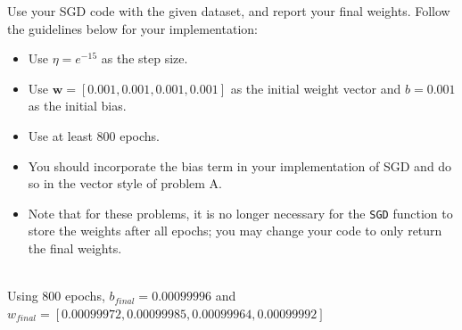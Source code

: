 \begin{problem}[6]
  Use your SGD code with the given dataset, and report your final weights. Follow the guidelines below for your implementation:

  \begin{itemize}
    \item Use $\eta = e^{-15}$ as the step size.  
    \item Use $\mathbf{w} = [0.001, 0.001, 0.001, 0.001]$ as the initial weight vector and $b = 0.001$ as the initial bias.
    \item Use at least 800 epochs.
    \item You should incorporate the bias term in your implementation of SGD and do so in the vector style of problem A.
    \item Note that for these problems, it is no longer necessary for the \texttt{SGD} function to store the weights after all epochs; you may change your code to only return the final weights.
  \end{itemize}
\end{problem}
\begin{solution}
  \\
  Using 800 epochs, $b_{final} = 0.00099996$ and $w_{final} = [0.00099972, 0.00099985, 0.00099964, 0.00099992]$
  
\end{solution}

